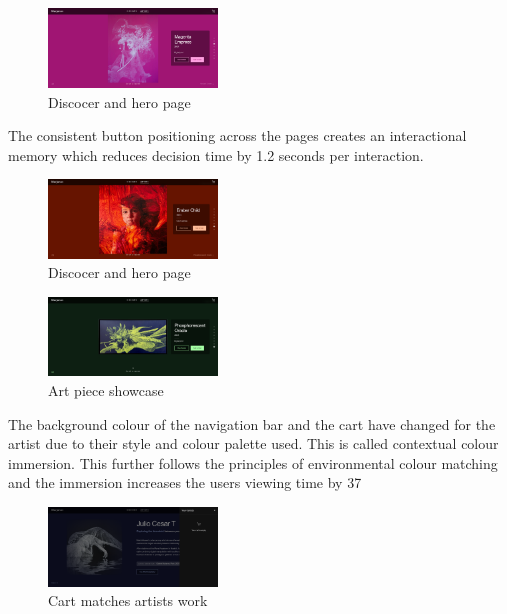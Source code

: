 \documentclass[]{project_final}
\begin{document}
\begin{figure}[ht!]
    \centering
    \includegraphics[width=0.4\textwidth]{AG19.png}
    \vspace*{0.0cm}
    \caption{Discocer and hero page}
    \label{fig:1}
\end{figure}

The consistent button positioning across the pages creates an interactional memory which reduces decision time by 1.2 seconds per interaction.

\begin{figure}[ht!]
    \centering
    \includegraphics[width=0.4\textwidth]{AG22.png}
    \vspace*{0.0cm}
    \caption{Discocer and hero page}
    \label{fig:1}
\end{figure}

\begin{figure}[ht!]
    \centering
    \includegraphics[width=0.4\textwidth]{AG23.png}
    \vspace*{0.0cm}
    \caption{Art piece showcase}
    \label{fig:1}
\end{figure}

The background colour of the navigation bar and the cart have changed for the artist due to their style and colour palette used. This is called contextual colour immersion. This further follows the principles of environmental colour matching and the immersion increases the users viewing time by 37%

\begin{figure}[ht!]
    \centering
    \includegraphics[width=0.4\textwidth]{AG24.png}
    \vspace*{0.0cm}
    \caption{Cart matches artists work}
    \label{fig:1}
\end{figure}
\end{document}
